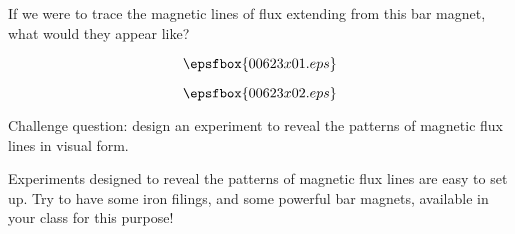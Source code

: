 

If we were to trace the magnetic lines of flux extending from this bar magnet, what would they appear like?

\vskip 50pt

$$\epsfbox{00623x01.eps}$$

\vskip 50pt







$$\epsfbox{00623x02.eps}$$

\vskip 10pt

Challenge question: design an experiment to reveal the patterns of magnetic flux lines in visual form.







Experiments designed to reveal the patterns of magnetic flux lines are easy to set up.  Try to have some iron filings, and some powerful bar magnets, available in your class for this purpose!




